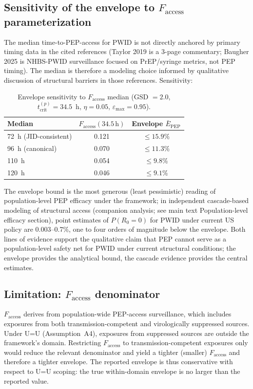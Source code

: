 \documentclass[11pt]{article}
\theoremstyle{definition}
\theoremstyle{remark}
\newcommand{\Ebarpep}{\bar{E}_{\text{PEP}}}
\newcommand{\Faccess}{F_{\text{access}}}
\newcommand{\tcrit}{t_{\text{crit}}}
\newcommand{\emax}{\varepsilon_{\max}}
\begin{document}
\subsection{Sensitivity of the envelope to $\Faccess$ parameterization}

The median time-to-PEP-access for PWID is not directly anchored by primary timing data in the cited references (Taylor 2019\cite{taylor2019_si} is a 3-page commentary; Baugher 2025\cite{baugher2025_si} is NHBS-PWID surveillance focused on PrEP/syringe metrics, not PEP timing). The median is therefore a modeling choice informed by qualitative discussion of structural barriers in those references. Sensitivity:

\begin{table}[H]
\centering
\small
\caption{Envelope sensitivity to $\Faccess$ median (GSD $= 2.0$, $\tcrit^{(p)} = 34.5$~h, $\eta = 0.05$, $\emax = 0.95$).}
\begin{tabular}{@{}lcc@{}}
\toprule
\textbf{Median} & \textbf{$\Faccess(34.5\,\text{h})$} & \textbf{Envelope $\Ebarpep$} \\
\midrule
72~h (JID-consistent) & 0.121 & $\leq 15.9\%$ \\
96~h (canonical)      & 0.070 & $\leq 11.3\%$ \\
110~h                 & 0.054 & $\leq 9.8\%$  \\
120~h                 & 0.046 & $\leq 9.1\%$  \\
\bottomrule
\end{tabular}
\end{table}

The envelope bound is the most generous (least pessimistic) reading of population-level PEP efficacy under the framework; in independent cascade-based modeling of structural access (companion analysis; see main text Population-level efficacy section), point estimates of $P(R_{0}=0)$ for PWID under current US policy are 0.003--0.7\%, one to four orders of magnitude below the envelope. Both lines of evidence support the qualitative claim that PEP cannot serve as a population-level safety net for PWID under current structural conditions; the envelope provides the analytical bound, the cascade evidence provides the central estimates.

\subsection{Limitation: $\Faccess$ denominator}

$\Faccess$ derives from population-wide PEP-access surveillance, which includes exposures from both transmission-competent and virologically suppressed sources. Under U=U (Assumption~A4), exposures from suppressed sources are outside the framework's domain. Restricting $\Faccess$ to transmission-competent exposures only would reduce the relevant denominator and yield a tighter (smaller) $\Faccess$ and therefore a tighter envelope. The reported envelope is thus conservative with respect to U=U scoping: the true within-domain envelope is no larger than the reported value.
\end{document}
